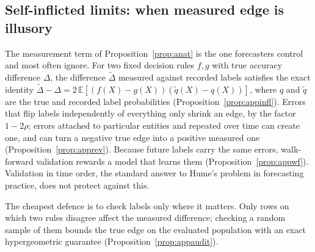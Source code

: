 \documentclass[journal]{IEEEtran}
\theoremstyle{definition}
\newcommand{\E}{\mathbb{E}}
\begin{document}
\subsection{Self-inflicted limits: when measured edge is illusory}\label{sec:res-self}
The measurement term of Proposition~\ref{prop:anat} is the one forecasters control and most often ignore. For two fixed decision rules $f,g$ with true accuracy difference $\Delta$, the difference $\tilde\Delta$ measured against recorded labels satisfies the exact identity $\tilde\Delta-\Delta=2\,\E[(f(X)-g(X))(\tilde q(X)-q(X))]$, where $q$ and $\tilde q$ are the true and recorded label probabilities (Proposition~\ref{prop:appinfl}). Errors that flip labels independently of everything only shrink an edge, by the factor $1-2\rho$; errors attached to particular entities and repeated over time can create one, and can turn a negative true edge into a positive measured one (Proposition~\ref{prop:apprev}). Because future labels carry the same errors, walk-forward validation rewards a model that learns them (Proposition~\ref{prop:appwf}). Validation in time order, the standard answer to Hume's problem in forecasting practice, does not protect against this.

The cheapest defence is to check labels only where it matters. Only rows on which two rules disagree affect the measured difference; checking a random sample of them bounds the true edge on the evaluated population with an exact hypergeometric guarantee (Proposition~\ref{prop:appaudit}).
\end{document}
